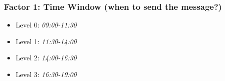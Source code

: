 \documentclass[10pt,xcolor=dvipsnames]{beamer}
\begin{document}
\begin{frame}[plain]
\frametitle{Factor 1: Time Window (when to send the message?)}
\begin{figure}
\end{figure}
\begin{itemize}
\item Level 0: {\em 09:00-11:30}
\item Level 1: {\em 11:30-14:00}
\item Level 2: {\em 14:00-16:30}
\item Level 3: {\em 16:30-19:00}
\end{itemize}
\bigskip
\end{frame}
\end{document}
